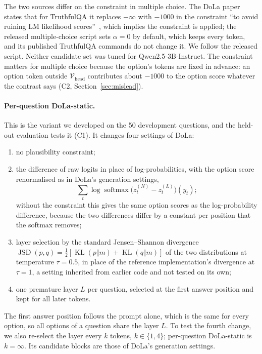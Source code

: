 \documentclass[11pt]{article}
\newcommand{\cha}[1]{\textsf{C#1}}
\newcommand{\method}{per-question DoLa-static}
\newcommand{\Method}{Per-question DoLa-static}
\newcommand{\mainmodel}{Qwen2.5-3B-Instruct}
\newcommand{\JSD}{\operatorname{JSD}}
\newcommand{\KL}{\operatorname{KL}}
\newcommand{\Vhead}{\mathcal{V}_{\mathrm{head}}}
\begin{document}
The two sources differ on the constraint in multiple choice. The DoLa paper states that for TruthfulQA it replaces
$-\infty$ with $-1000$ in the constraint ``to avoid ruining LM likelihood scores''~\citep{chuang2024dola}, which
implies the constraint is applied; the released multiple-choice script sets $\alpha = 0$ by default, which keeps
every token, and its published TruthfulQA commands do not change it. We follow the released script.
Neither candidate set was tuned for \mainmodel{}. The constraint matters for multiple choice because the option's
tokens are fixed in advance: an option token outside $\Vhead$ contributes about $-1000$ to the option score
whatever the contrast says (\cha2, Section~\ref{sec:mislead}).

\paragraph{\Method{}.}
This is the variant we developed on the 50 development questions, and the held-out evaluation tests it
(\cha1). It changes four settings of DoLa:
\begin{enumerate}
\item no plausibility constraint;
\item the difference of raw logits in place of log-probabilities, with the option score renormalised as in DoLa's
  generation settings,
  \[ \textstyle \sum_t \log \operatorname{softmax}\bigl(z^{(N)}_t - z^{(L)}_t\bigr)(y_t); \]
  without the constraint this gives the same option scores as the log-probability difference, because the two
  differences differ by a constant per position that the softmax removes;
\item layer selection by the standard Jensen--Shannon divergence $\JSD(p, q) = \tfrac12[\KL(p \Vert m) + \KL(q
  \Vert m)]$ of the two distributions at temperature $\tau = 0.5$, in place of the reference implementation's
  divergence at $\tau = 1$, a setting inherited from earlier code and not tested on its own;
\item one premature layer $L$ per question, selected at the first answer position and kept for all later tokens.
\end{enumerate}
The first answer position follows the prompt alone, which is the same for every option, so all options of a
question share the layer $L$. To test the fourth change, we also re-select the layer every $k$ tokens, $k \in \{1,
4\}$; \method{} is $k = \infty$. Its candidate blocks are those of DoLa's generation settings.
\end{document}

